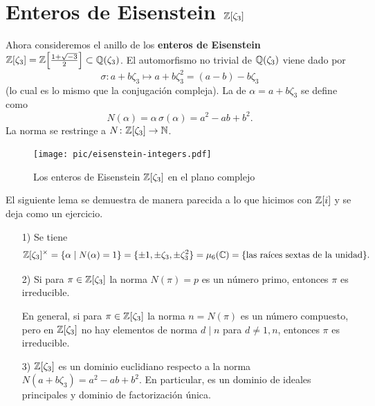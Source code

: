 
\section{Enteros de Eisenstein \texorpdfstring{$\mathbb{Z} [\zeta_3]$}{ℤ[ζ₃]}}

Ahora consideremos el anillo de los \textbf{enteros de Eisenstein}
$\mathbb{Z} [\zeta_3] = \mathbb{Z} \Bigl[\frac{1+\sqrt{-3}}{2}\Bigr] \subset \mathbb{Q} (\zeta_3)$.
El automorfismo no trivial de $\mathbb{Q} (\zeta_3)$ viene dado por
$$\sigma\colon a + b\zeta_3 \mapsto a + b\zeta_3^2 = (a-b) - b\zeta_3$$
(lo cual es lo mismo que la conjugación compleja). La  de
$\alpha = a + b\zeta_3$ se define como
$$N (\alpha) = \alpha\,\sigma (\alpha) = a^2 - ab + b^2.$$
La norma se restringe a $N\colon \mathbb{Z} [\zeta_3] \to \mathbb{N}$.

\begin{figure}
  \begin{center}
    \texttt{[image: pic/eisenstein-integers.pdf]}
  \end{center}

  \caption{Los enteros de Eisenstein $\mathbb{Z} [\zeta_3]$ en el plano complejo}
\end{figure}

El siguiente lema se demuestra de manera parecida a lo que hicimos con $\mathbb{Z} [i]$
y se deja como un ejercicio.

\begin{lema}
  \begin{enumerate}
  \item[1)] Se tiene
    \[ \mathbb{Z} [\zeta_3]^\times = \{ \alpha \mid N (\alpha) = 1 \}
           = \{ \pm 1, \pm \zeta_3, \pm \zeta_3^2 \}
           = \mu_6 (\mathbb{C})
           = \{ \text{las raíces sextas de la unidad} \}. \]

  \item[2)] Si para $\pi \in \mathbb{Z} [\zeta_3]$ la norma $N (\pi) = p$ es un número
    primo, entonces $\pi$ es irreducible.

    En general, si para $\pi \in \mathbb{Z} [\zeta_3]$ la norma $n = N (\pi)$ es
    un número compuesto, pero en $\mathbb{Z} [\zeta_3]$ no hay elementos de norma
    $d \mid n$ para $d \ne 1, n$, entonces $\pi$ es irreducible.

  \item[3)] $\mathbb{Z} [\zeta_3]$ es un dominio euclidiano respecto a la norma
    $N (a + b\zeta_3) = a^2 - ab + b^2$. En particular, es un dominio de ideales
    principales y dominio de factorización única.
  \end{enumerate}
\end{lema}

